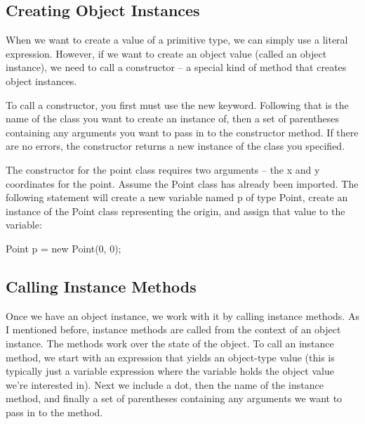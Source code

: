 \subsection{Creating Object Instances}

When we want to create a value of a primitive type, we can simply use a literal expression. However, if we want to create an object value (called an object instance), we need to call a constructor -- a special kind of method that creates object instances. 

To call a constructor, you first must use the new keyword. Following that is the name of the class you want to create an instance of, then a set of parentheses containing any arguments you want to pass in to the constructor method. If there are no errors, the constructor returns a new instance of the class you specified. 

\begin{exa}
The constructor for the point class requires two arguments -- the x and y coordinates for the point. Assume the Point class has already been imported. The following statement will create a new variable named p of type Point, create an instance of the Point class representing the origin, and assign that value to the variable:

\begin{code}
Point p = new Point(0, 0);
\end{code} 
\end{exa}

\subsection{Calling Instance Methods}

Once we have an object instance, we work with it by calling instance methods. As I mentioned before, instance methods are called from the context of an object instance. The methods work over the state of the object. To call an instance method, we start with an expression that yields an object-type value (this is typically just a variable expression where the variable holds the object value we're interested in). Next we include a dot, then the name of the instance method, and finally a set of parentheses containing any arguments we want to pass in to the method. 

